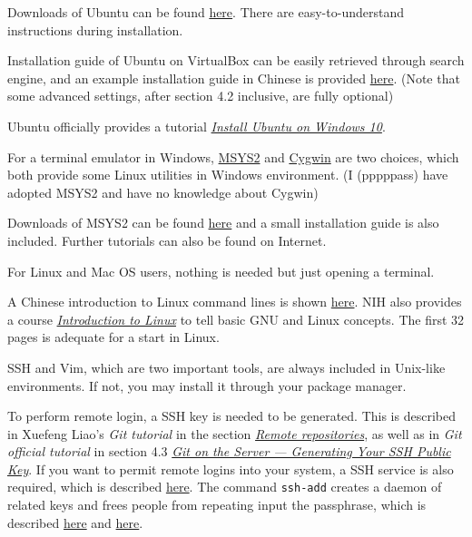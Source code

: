 \documentclass[english]{../TeXTemplate/pkupaper}
\begin{document}
Downloads of Ubuntu can be found \href{https://www.ubuntu.com/download/desktop}{here}. There are easy-to-understand instructions during installation.

Installation guide of Ubuntu on VirtualBox can be easily retrieved through search engine, and an example installation guide in Chinese is provided \href{http://www.linuxidc.com/Linux/2016-08/134580.htm}{here}. (Note that some advanced settings, after section 4.2 inclusive, are fully optional)

Ubuntu officially provides a tutorial \href{https://tutorials.ubuntu.com/tutorial/tutorial-ubuntu-on-windows}{\emph{Install Ubuntu on Windows 10}}.

For a terminal emulator in Windows, \href{http://www.msys2.org/}{MSYS2} and \href{https://www.cygwin.com/}{Cygwin} are two choices, which both provide some Linux utilities in Windows environment. (I (pppppass) have adopted MSYS2 and have no knowledge about Cygwin)

Downloads of MSYS2 can be found \href{http://www.msys2.org/}{here} and a small installation guide is also included. Further tutorials can also be found on Internet.

For Linux and Mac OS users, nothing is needed but just opening a terminal.

A Chinese introduction to Linux command lines is shown \href{https://linux.cn/article-6160-1.html}{here}. NIH also provides a course \href{https://hpc.nih.gov/training/handouts/Linux_NIH_2017.pdf}{\emph{Introduction to Linux}} to tell basic GNU and Linux concepts. The first 32 pages is adequate for a start in Linux.

SSH and Vim, which are two important tools, are always included in Unix-like environments. If not, you may install it through your package manager.

To perform remote login, a SSH key is needed to be generated. This is described in Xuefeng Liao's \emph{Git tutorial} in the section \href{https://www.liaoxuefeng.com/wiki/0013739516305929606dd18361248578c67b8067c8c017b000/001374385852170d9c7adf13c30429b9660d0eb689dd43a000}{\emph{Remote repositories}}, as well as in \emph{Git official tutorial} in section 4.3 \href{https://git-scm.com/book/en/v2/Git-on-the-Server-Generating-Your-SSH-Public-Key}{\emph{Git on the Server --- Generating Your SSH Public Key}}. If you want to permit remote logins into your system, a SSH service is also required, which is described \href{http://www.linuxidc.com/Linux/2010-02/24349.htm}{here}. The command \verb"ssh-add" creates a daemon of related keys and frees people from repeating input the passphrase, which is described \href{http://blog.csdn.net/vizts/article/details/47043695}{here} and \href{https://www.cnblogs.com/kex1n/p/5229493.html}{here}.
\end{document}
